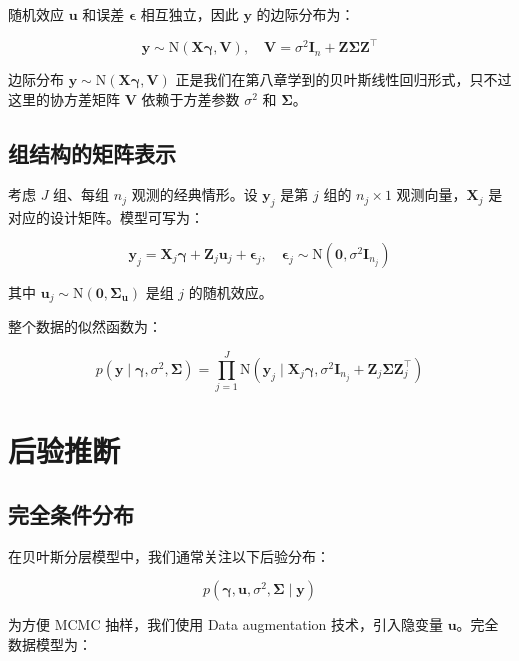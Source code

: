 随机效应 $\mathbf{u}$ 和误差 $\boldsymbol{\epsilon}$ 相互独立，因此 $\mathbf{y}$ 的边际分布为：

\[
\mathbf{y} \sim \mathrm{N}(\mathbf{X}\boldsymbol{\gamma}, \mathbf{V}), \quad \mathbf{V} = \sigma^2 \mathbf{I}_n + \mathbf{Z}\boldsymbol{\Sigma}\mathbf{Z}^\top
\]

\begin{Remark}
边际分布 $\mathbf{y} \sim \mathrm{N}(\mathbf{X}\boldsymbol{\gamma}, \mathbf{V})$ 正是我们在第八章学到的贝叶斯线性回归形式，只不过这里的协方差矩阵 $\mathbf{V}$ 依赖于方差参数 $\sigma^2$ 和 $\boldsymbol{\Sigma}$。
\end{Remark}

\subsection{组结构的矩阵表示}
\label{sec:group-structure}

考虑 $J$ 组、每组 $n_j$ 观测的经典情形。设 $\mathbf{y}_j$ 是第 $j$ 组的 $n_j \times 1$ 观测向量，$\mathbf{X}_j$ 是对应的设计矩阵。模型可写为：

\[
\mathbf{y}_j = \mathbf{X}_j \boldsymbol{\gamma} + \mathbf{Z}_j \mathbf{u}_j + \boldsymbol{\epsilon}_j, \quad \boldsymbol{\epsilon}_j \sim \mathrm{N}(\mathbf{0}, \sigma^2 \mathbf{I}_{n_j})
\]

其中 $\mathbf{u}_j \sim \mathrm{N}(\mathbf{0}, \boldsymbol{\Sigma}_\mathbf{u})$ 是组 $j$ 的随机效应。

整个数据的似然函数为：

\[
p(\mathbf{y} \mid \boldsymbol{\gamma}, \sigma^2, \boldsymbol{\Sigma}) = \prod_{j=1}^J \mathrm{N}(\mathbf{y}_j \mid \mathbf{X}_j\boldsymbol{\gamma}, \sigma^2 \mathbf{I}_{n_j} + \mathbf{Z}_j \boldsymbol{\Sigma} \mathbf{Z}_j^\top)
\]

\section{后验推断}
\label{sec:posterior-inference-hlm}

\subsection{完全条件分布}
\label{sec:full-conditional}

在贝叶斯分层模型中，我们通常关注以下后验分布：

\[
p(\boldsymbol{\gamma}, \mathbf{u}, \sigma^2, \boldsymbol{\Sigma} \mid \mathbf{y})
\]

为方便 MCMC 抽样，我们使用 Data augmentation 技术，引入隐变量 $\mathbf{u}$。完全数据模型为：


